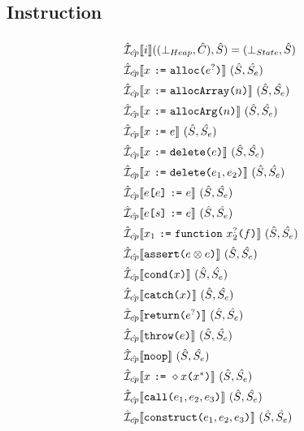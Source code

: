\subsection{Instruction}
\[
\renewcommand\arraystretch{1.5}
\begin{array}{l}

\aI_{\acp} \lbr i \rbr ((\bot_{Heap}, \hat{C}), \hat{S})  = (\bot_{State}, \hat{S}) \\
\aI_{\acp} \lbr x~\verb+:=+~\TT{alloc}\verb+(+ e^{?} \verb+)+ \rbr\ (\hat{S}, \hat{S_e}) \\
\aI_{\acp} \lbr x~\verb+:=+~\TT{allocArray}\verb+(+n\verb+)+ \rbr\ (\hat{S}, \hat{S_e}) \\
\aI_{\acp} \lbr x~\verb+:=+~\TT{allocArg}\verb+(+n\verb+)+ \rbr\ (\hat{S}, \hat{S_e}) \\
\aI_{\acp} \lbr x ~\verb+:=+~ e \rbr\ (\hat{S}, \hat{S_e}) \\
\aI_{\acp} \lbr x ~\verb+:=+~ \TT{delete}\verb+(+e\verb+)+ \rbr\ (\hat{S}, \hat{S_e}) \\
\aI_{\acp} \lbr x ~\verb+:=+~ \TT{delete}\verb+(+e_1,e_2\verb+)+ \rbr\ (\hat{S}, \hat{S_e}) \\
\aI_{\acp} \lbr e\verb+[+e\verb+]+ ~\verb+:=+~ e \rbr\ (\hat{S}, \hat{S_e}) \\
\aI_{\acp} \lbr e\verb+[+s\verb+]+ ~\verb+:=+~ e \rbr\ (\hat{S}, \hat{S_e}) \\
\aI_{\acp} \lbr x_1 ~\verb+:=+~ \TT{function} ~x_2^{?}\verb+(+f\verb+)+ \rbr\ (\hat{S}, \hat{S_e}) \\
\aI_{\acp} \lbr \TT{assert}\verb+(+e\inop e\verb+)+ \rbr\ (\hat{S}, \hat{S_e}) \\
\aI_{\acp} \lbr \TT{cond}\verb+(+x\verb+)+ \rbr\ (\hat{S}, \hat{S_e}) \\
\aI_{\acp} \lbr \TT{catch}\verb+(+x\verb+)+ \rbr\ (\hat{S}, \hat{S_e}) \\
\aI_{\acp} \lbr \TT{return}\verb+(+e^{?}\verb+)+ \rbr\ (\hat{S}, \hat{S_e}) \\
\aI_{\acp} \lbr \TT{throw}\verb+(+e\verb+)+ \rbr\ (\hat{S}, \hat{S_e}) \\
\aI_{\acp} \lbr \TT{noop} \rbr\ (\hat{S}, \hat{S_e}) \\
\aI_{\acp} \lbr x ~\verb+:=+~\ensuremath{\diamond}x\verb+(+x^{*}\verb+)+ \rbr\ (\hat{S}, \hat{S_e}) \\
\aI_{\acp} \lbr \TT{call}\verb+(+e_1,e_2,e_3\verb+)+ \rbr\ (\hat{S}, \hat{S_e}) \\
\aI_{\acp} \lbr \TT{construct}\verb+(+e_1,e_2,e_3\verb+)+ \rbr\ (\hat{S}, \hat{S_e}) \\

\end{array}
\]

